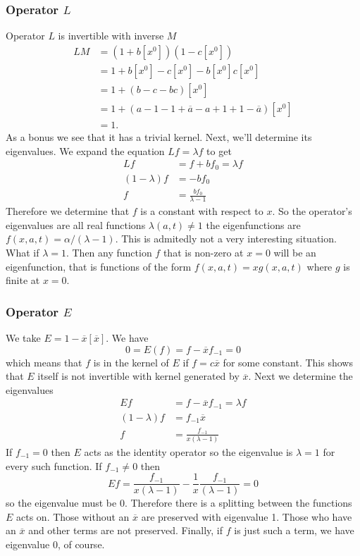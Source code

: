 \documentclass[12pt]{article}
\theoremstyle{definition} \newtheorem{definition}[theorem]{Definition}
\newcommand{\ol}[1]{\overline{#1}}
\begin{document}
\subsubsection{Operator $L$}
Operator $L$ is invertible with inverse $M$
\begin{align*}
	L M &= (1+b[x^0])(1-c[x^0]) \\
	& = 1+b[x^0]-c[x^0]-b[x^0]c[x^0]\\
	& = 1 + (b-c-bc)[x^0]\\
	& = 1 + (a-1-1+\ol{a}-a+1+1-\ol{a})[x^0]\\
	& = 1.
\end{align*}
As a bonus we see that it has a trivial kernel. Next, we'll determine its eigenvalues. We expand the equation $Lf = \lambda f$ to get
\begin{align*}
	Lf &= f + b f_0 = \lambda f\\
	(1-\lambda)f &= -bf_0\\
	f&=\frac{b f_0}{\lambda - 1}
\end{align*}
Therefore we determine that $f$ is a constant with respect to $x$. So the operator's eigenvalues are all real functions $\lambda(a,t) \neq 1$ the eigenfunctions are $f(x,a,t) = \alpha/(\lambda - 1)$. This is admitedly not a very interesting situation. What if $\lambda = 1$. Then any function $f$ that is non-zero at $x = 0$ will be an eigenfunction, that is functions of the form $f(x,a,t) = x g(x,a,t)$ where $g$ is finite at $x = 0$.
\subsubsection{Operator $E$}
We take $E = 1 - \ol{x} [\ol{x}]$. We have
\[
	0 = E(f) = f - \ol{x}f_{-1} = 0
\]
which means that $f$ is in the kernel of $E$ if $f = c\ol{x}$ for some constant. This shows that $E$ itself is not invertible with kernel generated by $\ol{x}$. Next we determine the eigenvalues
\begin{align*}
	Ef &= f - \ol{x} f_{-1} = \lambda f\\
	(1-\lambda)f &= f_{-1}\ol{x}\\
	f&=\frac{f_{-1}}{x(\lambda - 1)}
\end{align*}
If $f_{-1} = 0$ then $E$ acts as the identity operator so the eigenvalue is $\lambda = 1$ for every such function. If $f_{-1} \neq 0$ then
\[
	Ef = \frac{f_{-1}}{x(\lambda - 1)} - \frac{1}{x}\frac{f_{-1}}{(\lambda - 1)} = 0
\]
so the eigenvalue must be 0. Therefore there is a splitting between the functions $E$ acts on. Those without an $\ol{x}$ are preserved with eigenvalue 1. Those who have an $\ol{x}$ and other terms are not preserved. Finally, if $f$ is just such a term, we have eigenvalue 0, of course.
\end{document}
